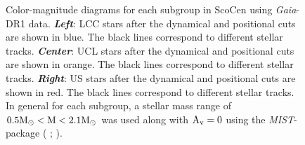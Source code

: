 \begin{figure}[!ht]
\centering
\caption{\scriptsize{Color-magnitude diagrams for each subgroup in ScoCen using \textit{Gaia}-DR1 data. \textit{\textbf{Left}}: LCC stars after the dynamical and positional cuts are shown in blue. The black lines correspond to different stellar tracks. \textit{\textbf{Center}}: UCL stars after the dynamical and positional cuts are shown in orange. The black lines correspond to different stellar tracks. \textit{\textbf{Right}}: US stars after the dynamical and positional cuts are shown in red. The black lines correspond to different stellar tracks. In general for each subgroup, a stellar mass range of $0.5 \textnormal{M}_\odot < \textnormal{M} < 2.1 \textnormal{M}_\odot$ was used along with $\textnormal{A}_\textnormal{v} = 0$ using the \textit{MIST}-package ( \citeyear{2016ApJS..222....8D};  \citeyear{2016ApJ...823..102C}).}}
\label{fig:Stellar_Tracks_1}
\end{figure}

